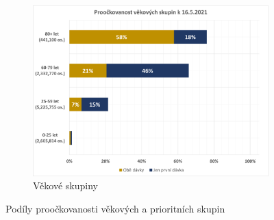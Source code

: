 \begin{figure}
\begin{subfigure}{0.9\textwidth}
\includegraphics[height=0.3\textheight, width=\textwidth]{assets/proockovanost_veksk}
\caption{Věkové skupiny}
\label{proockovanost_vek}
\end{subfigure}



\caption{Podíly proočkovanosti věkových a prioritních skupin}
\label{proockovanost_podily}

\end{figure}



